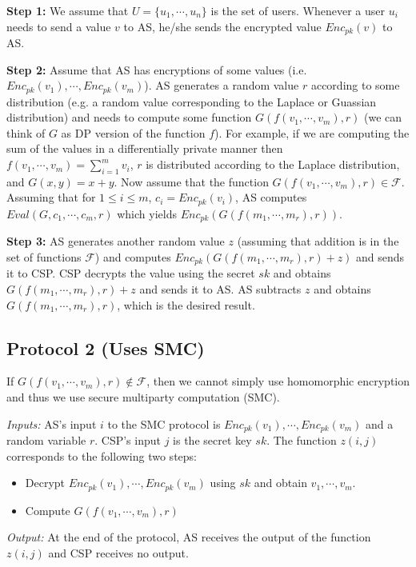 \noindent
{\bf Step 1:} We assume that $U=\{ u_1, \cdots, u_n \}$ is the set of
users. Whenever a user $u_i$ needs to send a value $v$ to AS, he/she
sends the encrypted value $Enc_{pk} (v)$ to AS.

\noindent
{\bf Step 2:} Assume that AS has encryptions of some values
(i.e. $Enc_{pk}(v_1),\cdots,Enc_{pk}(v_m)$). AS generates a random
value $r$ according to some distribution (e.g. a random value
corresponding to the Laplace or Guassian distribution) and needs to
compute some function $G(f(v_1,\cdots,v_m),r)$ (we can think of $G$ as
DP version of the function $f$). For example, if we are computing the
sum of the values in a differentially private manner then
$f(v_1,\cdots,v_m) = \sum_{i=1}^m v_i$, $r$ is distributed according
to the Laplace distribution, and $G(x,y) = x+y$. Now assume that the
function $G(f(v_1,\cdots,v_m),r) \in \mathcal{F}$. Assuming that for
$1 \leq i \leq m$, $c_i = Enc_{pk}(v_i)$, AS computes
$Eval(G,c_1,\cdots,c_m,r)$ which yields $Enc_{pk}(G(f(m_1,\cdots,m_r),r))$.

\noindent
{\bf Step 3:} AS generates another random value $z$ (assuming that
addition is in the set of functions $\mathcal{F}$) and computes
$Enc_{pk}(G(f(m_1,\cdots,m_r),r)+z)$ and sends it to CSP. CSP decrypts
the value using the secret $sk$ and obtains $G(f(m_1,\cdots,m_r),r)+z$
and sends it to AS.  AS subtracts $z$ and obtains
$G(f(m_1,\cdots,m_r),r)$, which is the desired result.

\subsection{Protocol 2 (Uses SMC)}

If $G(f(v_1,\cdots,v_m),r) \not\in \mathcal{F}$, then we cannot simply
use homomorphic encryption and thus we use secure multiparty
computation (SMC).

{\it Inputs:} AS's input $i$ to the SMC protocol is
$Enc_{pk}(v_1),\cdots,Enc_{pk}(v_m)$ and a random variable $r$. CSP's
input $j$ is the secret key $sk$. The function $z (i,j)$ corresponds
to the following two steps:
\begin{itemize}
\item Decrypt $Enc_{pk}(v_1),\cdots,Enc_{pk}(v_m)$ using $sk$ and obtain
$v_1,\cdots,v_m$.
\item Compute $G(f(v_1,\cdots,v_m),r)$
\end{itemize}

{\it Output:} At the end of the protocol, AS receives the output of the
function $z(i,j)$ and CSP receives no output.



